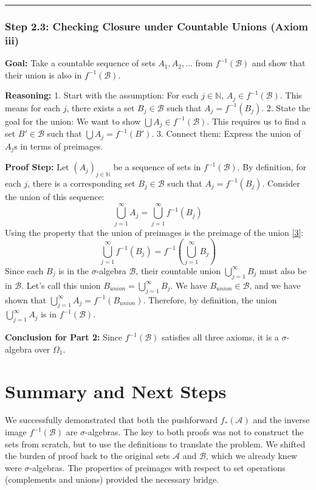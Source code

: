 \documentclass[11pt,a4paper]{article}
\begin{document}
\vspace{1em}
\hrule
\vspace{1em}

\subsubsection*{Step 2.3: Checking Closure under Countable Unions (Axiom iii)}
\textbf{Goal:} Take a countable sequence of sets \(A_1, A_2, \dots\) from \(f^{-1}(\mathcal{B})\) and show that their union is also in \(f^{-1}(\mathcal{B})\).

\textbf{Reasoning:}
1. Start with the assumption: For each \(j \in \mathbb{N}\), \(A_j \in f^{-1}(\mathcal{B})\). This means for each \(j\), there exists a set \(B_j \in \mathcal{B}\) such that \(A_j = f^{-1}(B_j)\).
2. State the goal for the union: We want to show \(\bigcup A_j \in f^{-1}(\mathcal{B})\). This requires us to find a set \(B' \in \mathcal{B}\) such that \(\bigcup A_j = f^{-1}(B')\).
3. Connect them: Express the union of \(A_j\)s in terms of preimages.

\textbf{Proof Step:}
Let \((A_j)_{j \in \mathbb{N}}\) be a sequence of sets in \(f^{-1}(\mathcal{B})\). By definition, for each \(j\), there is a corresponding set \(B_j \in \mathcal{B}\) such that \(A_j = f^{-1}(B_j)\).
Consider the union of this sequence:
\[ \bigcup_{j=1}^{\infty} A_j = \bigcup_{j=1}^{\infty} f^{-1}(B_j) \]
Using the property that the union of preimages is the preimage of the union \hyperlink{def:set-properties}{[3]}:
\[ \bigcup_{j=1}^{\infty} f^{-1}(B_j) = f^{-1}\left(\bigcup_{j=1}^{\infty} B_j\right) \]
Since each \(B_j\) is in the \(\sigma\)-algebra \(\mathcal{B}\), their countable union \(\bigcup_{j=1}^{\infty} B_j\) must also be in \(\mathcal{B}\).
Let's call this union \(B_{union} = \bigcup_{j=1}^{\infty} B_j\). We have \(B_{union} \in \mathcal{B}\), and we have shown that \(\bigcup_{j=1}^{\infty} A_j = f^{-1}(B_{union})\).
Therefore, by definition, the union \(\bigcup_{j=1}^{\infty} A_j\) is in \(f^{-1}(\mathcal{B})\).

\textbf{Conclusion for Part 2:} Since \(f^{-1}(\mathcal{B})\) satisfies all three axioms, it is a \(\sigma\)-algebra over \(\Omega_1\). \qedsymbol

\section{Summary and Next Steps}

We successfully demonstrated that both the pushforward \(f_*(\mathcal{A})\) and the inverse image \(f^{-1}(\mathcal{B})\) are \(\sigma\)-algebras. The key to both proofs was not to construct the sets from scratch, but to use the definitions to translate the problem. We shifted the burden of proof back to the original sets \(\mathcal{A}\) and \(\mathcal{B}\), which we already knew were \(\sigma\)-algebras. The properties of preimages with respect to set operations (complements and unions) provided the necessary bridge.
\end{document}
